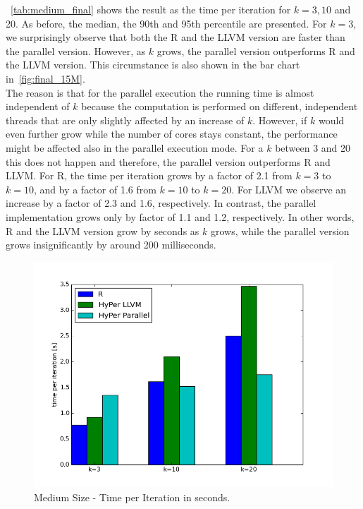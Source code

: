 ~\autoref{tab:medium_final} shows the result as the time per iteration for $k = 3, 10$ and 20. As before, the median, the 90th and 95th percentile are presented. For $k = 3$, we surprisingly observe that both the R and the LLVM version are faster than the parallel version. However, as $k$ grows, the parallel version outperforms R and the LLVM version. This circumstance is also shown in the bar chart in~\autoref{fig:final_15M}.
\\
The reason is that for the parallel execution the running time is almost independent of $k$ because the computation is performed on different, independent threads that are only slightly affected by an increase of $k$. However, if $k$ would even further grow while the number of cores stays constant, the performance might be affected also in the parallel execution mode. For a $k$ between 3 and 20 this does not happen and therefore, the parallel version outperforms R and LLVM. For R, the time per iteration grows by a factor of 2.1 from $k = 3$ to $k = 10$, and by a factor of 1.6 from $k = 10$ to $k = 20$. For LLVM we observe an increase by a factor of 2.3 and 1.6, respectively. In contrast, the parallel implementation grows only by factor of 1.1 and 1.2, respectively. In other words, R and the LLVM version grow by seconds as $k$ grows, while the parallel version grows insignificantly by around 200 milliseconds. 

\begin{figure}[htsb]
  \centering
  \includegraphics[scale=0.5, trim="0cm 1.5cm 0cm 0cm"]{figures/charts/final_15M}
  \caption[Medium Size - Time per Iteration (Parallel)]{Medium Size - Time per Iteration in seconds.}
  \label{fig:final_15M}
\end{figure}

